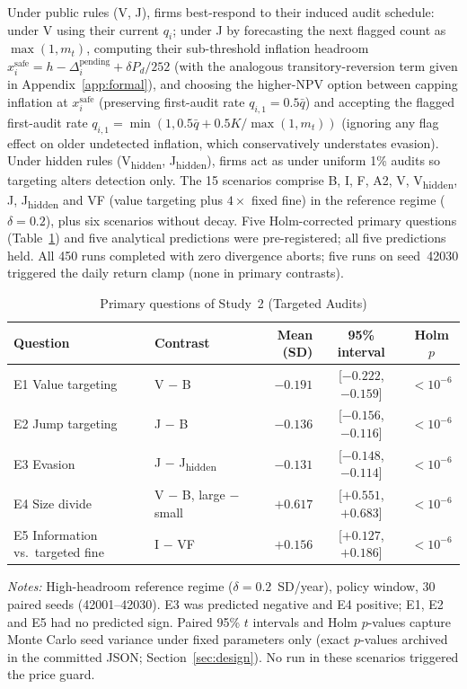 \documentclass[11pt]{article}
\newcommand{\Vh}{V\textsubscript{hidden}}
\newcommand{\Jh}{J\textsubscript{hidden}}
\begin{document}
Under public rules (V, J), firms best-respond to their induced audit schedule: under V using their current $q_i$; under J by forecasting the next flagged count as $\max(1, m_t)$, computing their sub-threshold inflation headroom $x_i^{\mathrm{safe}} = h - \Delta_i^{\mathrm{pending}} + \delta P_d / 252$ (with the analogous transitory-reversion term given in Appendix~\ref{app:formal}), and choosing the higher-NPV option between capping inflation at $x_i^{\mathrm{safe}}$ (preserving first-audit rate $q_{i,1} = 0.5\bar q$) and accepting the flagged first-audit rate $q_{i,1} = \min(1, 0.5\bar q + 0.5K/\max(1, m_t))$ (ignoring any flag effect on older undetected inflation, which conservatively understates evasion). Under hidden rules (\Vh, \Jh), firms act as under uniform 1\% audits so targeting alters detection only. The 15 scenarios comprise B, I, F, A2, V, \Vh, J, \Jh{} and VF (value targeting plus $4\times$ fixed fine) in the reference regime ($\delta = 0.2$), plus six scenarios without decay. Five Holm-corrected primary questions (Table~\ref{tab:audit_primary}) and five analytical predictions were pre-registered; all five predictions held. All 450 runs completed with zero divergence aborts; five runs on seed~42030 triggered the daily return clamp (none in primary contrasts).

\begin{table}[t]
\centering
\small
\begin{threeparttable}
\caption{Primary questions of Study~2 (Targeted Audits)}
\label{tab:audit_primary}
\begin{tabular}{@{}llrcc@{}}
\toprule
Question & Contrast & Mean (SD) & 95\% interval & Holm $p$ \\
\midrule
E1 Value targeting & V $-$ B & $-0.191$ & [$-0.222$, $-0.159$] & $< 10^{-6}$ \\
E2 Jump targeting & J $-$ B & $-0.136$ & [$-0.156$, $-0.116$] & $< 10^{-6}$ \\
E3 Evasion & J $-$ \Jh & $-0.131$ & [$-0.148$, $-0.114$] & $< 10^{-6}$ \\
E4 Size divide & V $-$ B, large $-$ small & $+0.617$ & [$+0.551$, $+0.683$] & $< 10^{-6}$ \\
E5 Information vs.\ targeted fine & I $-$ VF & $+0.156$ & [$+0.127$, $+0.186$] & $< 10^{-6}$ \\
\bottomrule
\end{tabular}
\begin{tablenotes}[flushleft]\footnotesize
\item \textit{Notes:} High-headroom reference regime ($\delta = 0.2$~SD/year), policy window, 30 paired seeds (42001--42030). E3 was predicted negative and E4 positive; E1, E2 and E5 had no predicted sign. Paired 95\% $t$ intervals and Holm $p$-values capture Monte Carlo seed variance under fixed parameters only (exact $p$-values archived in the committed JSON; Section~\ref{sec:design}). No run in these scenarios triggered the price guard.
\end{tablenotes}
\end{threeparttable}
\end{table}
\end{document}
